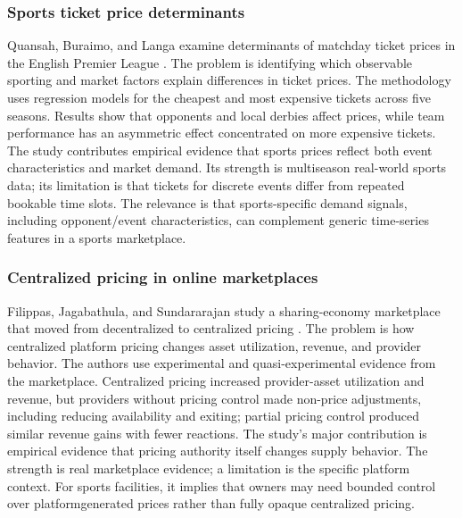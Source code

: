 \subsubsection{Sports ticket price determinants}
Quansah, Buraimo, and Langa examine determinants of matchday ticket prices in the English Premier League \cite{r10}. The problem is identifying which observable sporting and market factors explain differences in ticket prices. The methodology uses regression models for the cheapest and most expensive tickets across five seasons. Results show that opponents and local derbies affect prices, while team performance has an asymmetric effect concentrated on more expensive tickets. The study contributes empirical evidence that sports prices reflect both event characteristics and market demand. Its strength is multiseason real-world sports data; its limitation is that tickets for discrete events differ from repeated bookable time slots. The relevance is that sports-specific demand signals, including opponent/event characteristics, can complement generic time-series features in a sports marketplace.

\subsubsection{Centralized pricing in online marketplaces}
Filippas, Jagabathula, and Sundararajan study a sharing-economy marketplace that moved from decentralized to centralized pricing \cite{r11}. The problem is how centralized platform pricing changes asset utilization, revenue, and provider behavior. The authors use experimental and quasi-experimental evidence from the marketplace. Centralized pricing increased provider-asset utilization and revenue, but providers without pricing control made non-price adjustments, including reducing availability and exiting; partial pricing control produced similar revenue gains with fewer reactions. The study's major contribution is empirical evidence that pricing authority itself changes supply behavior. The strength is real marketplace evidence; a limitation is the specific platform context. For sports facilities, it implies that owners may need bounded control over platformgenerated prices rather than fully opaque centralized pricing.

